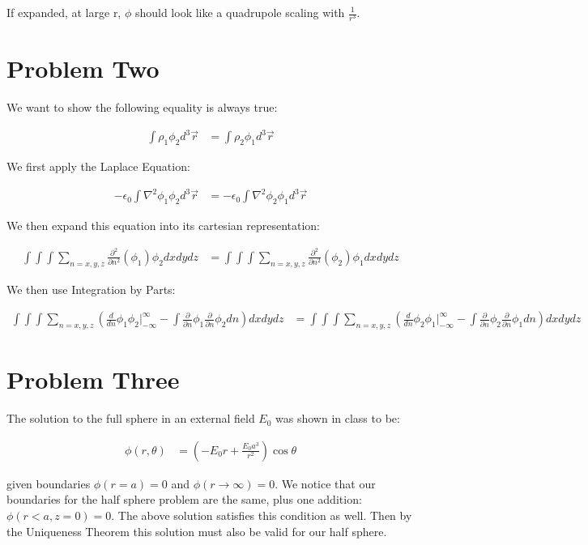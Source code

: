 \documentclass[10pt]{article} %
\begin{document}
If expanded, at large r, $\phi$ should look like a quadrupole scaling with $\frac{1}{r^3}$.\\

\section{Problem Two}
We want to show the following equality is always true:

\begin{align*}
  \int\rho_1\phi_2d^3\vec{r} &= \int\rho_2\phi_1d^3\vec{r}
\end{align*}

We first apply the Laplace Equation:

\begin{align*}
  -\epsilon_0\int\nabla^2\phi_1\phi_2d^3\vec{r} &= -\epsilon_0\int\nabla^2\phi_2\phi_1d^3\vec{r}
\end{align*}

We then expand this equation into its cartesian representation:

\begin{align*}
  \int\int\int\sum_{n=x,y,z}\frac{\partial^2}{\partial n^2} (\phi_1) \phi_2 dxdydz &=
  \int\int\int\sum_{n=x,y,z}\frac{\partial^2}{\partial n^2} (\phi_2) \phi_1 dxdydz
\end{align*}

We then use Integration by Parts:

\begin{align*}
  \int\int\int\sum_{n=x,y,z}\left(\frac{d}{dn}\phi_1\phi_2\Big|_{-\infty}^{\infty} - \int\frac{\partial}{\partial n}\phi_1\frac{\partial}{\partial n}\phi_2dn \right) dxdydz &=
  \int\int\int\sum_{n=x,y,z}\left(\frac{d}{dn}\phi_2\phi_1\Big|_{-\infty}^{\infty} - \int\frac{\partial}{\partial n}\phi_2\frac{\partial}{\partial n}\phi_1dn \right) dxdydz
\end{align*}

\section{Problem Three}
The solution to the full sphere in an external field $E_0$ was shown in class to be:

\begin{align*}
  \phi(r,\theta) &= \left(-E_0r + \frac{E_0a^3}{r^2}\right)\cos\theta
\end{align*}

given boundaries $\phi(r=a) = 0$ and $\phi(r\rightarrow\infty) = 0$. We notice that our boundaries for the half sphere problem are the same, plus one addition: $\phi(r<a, z=0) = 0$. The above solution satisfies this condition as well. Then by the Uniqueness Theorem this solution must also be valid for our half sphere.\\
\end{document}
